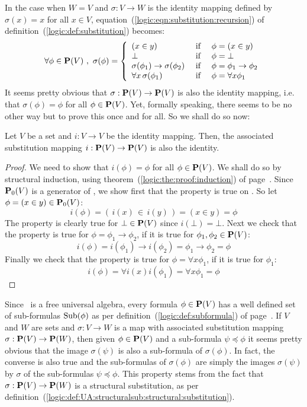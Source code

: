 In the case when $W=V$ and $\sigma:V\to W$ is the identity mapping
defined by $\sigma(x)=x$ for all $x\in V$,
equation~(\ref{logic:eqn:substitution:recursion}) of
definition~(\ref{logic:def:substitution}) becomes:
    \[
    \forall\phi\in\pv\ ,\ \sigma(\phi)=\left\{
                    \begin{array}{lcl}
                    (x\in y)&\mbox{\ if\ }&\phi=(x\in y)\\
                    \bot&\mbox{\ if\ }&\phi=\bot\\
                    \sigma(\phi_{1})\to \sigma(\phi_{2}) &\mbox{\ if\ }&\phi=\phi_{1}\to\phi_{2}\\
                    \forall x\,\sigma(\phi_{1})&\mbox{\ if\ }&\phi=\forall x\phi_{1}
                    \end{array}\right.
    \]
It seems pretty obvious that $\sigma:\mbox{${\bf P}(V)$}\to\mbox{${\bf P}(V)$}$ is also the identity
mapping, i.e. that $\sigma(\phi)=\phi$ for all $\phi\in\mbox{${\bf P}(V)$}$. Yet,
formally speaking, there seems to be no other way but to prove this
once and for all. So we shall do so now:
\begin{prop}\label{logic:prop:substitution:identity}
Let $V$ be a set and $i:V\to V$ be the identity mapping. Then, the
associated substitution mapping $i:\mbox{${\bf P}(V)$}\to\mbox{${\bf P}(V)$}$ is also the identity.
\end{prop}
\begin{proof}
We need to show that $i(\phi)=\phi$ for all $\phi\in\mbox{${\bf P}(V)$}$. We shall
do so by structural induction, using
theorem~(\ref{logic:the:proof:induction}) of
page~\pageref{logic:the:proof:induction}. Since $\mbox{${\bf P}_{0}(V)$}$ is a
generator of \pv, we show first that the property is true on \pvo.
So let $\phi = (x\in y)\in\mbox{${\bf P}_{0}(V)$}$:
    \[
    i(\phi)=(\,i(x)\,\in\,i(y)\,)=
    (x\in y)=\phi
    \]
The property is clearly true for $\bot\in\mbox{${\bf P}(V)$}$ since $i(\bot)=\bot$.
Next we check that the property is true for
$\phi=\phi_{1}\to\phi_{2}$, if it is true for
$\phi_{1},\phi_{2}\in\mbox{${\bf P}(V)$}$:
    \[
    i(\phi)=i(\phi_{1})\to i(\phi_{2})=\phi_{1}\to\phi_{2}=\phi
    \]
Finally we check that the property is true for $\phi=\forall
x\phi_{1}$, if it is true for $\phi_{1}$:
    \[
    i(\phi)=\forall i(x)i(\phi_{1})=\forall x\phi_{1}=\phi
    \]
\end{proof}

Since \pv\ is a free universal algebra, every formula $\phi\in\mbox{${\bf P}(V)$}$
has a well defined set of sub-formulas $\mbox{\rm Sub}(\phi)$ as per
definition~(\ref{logic:def:subformula}) of
page~\pageref{logic:def:subformula}. If $V$ and $W$ are sets and
$\sigma:V\to W$ is a map with associated substitution mapping
$\sigma:\mbox{${\bf P}(V)$}\to{\bf P}(W)$, then given $\phi\in\mbox{${\bf P}(V)$}$ and a sub-formula
$\psi\preceq\phi$ it seems pretty obvious that the image
$\sigma(\psi)$ is also a sub-formula of $\sigma(\phi)$. In fact, the
converse is also true and the sub-formulas of $\sigma(\phi)$ are
simply the images $\sigma(\psi)$ by $\sigma$ of the sub-formulas
$\psi\preceq\phi$. This property stems from the fact that
$\sigma:\mbox{${\bf P}(V)$}\to{\bf P}(W)$ is a structural substitution, as per
definition~(\ref{logic:def:UA:structuralsub:structural:substitution}).

